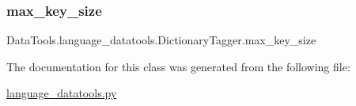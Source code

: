 \subsubsection{\texorpdfstring{max\+\_\+key\+\_\+size}{max\_key\_size}}
{\footnotesize\ttfamily Data\+Tools.\+language\+\_\+datatools.\+Dictionary\+Tagger.\+max\+\_\+key\+\_\+size}



The documentation for this class was generated from the following file\+:\begin{DoxyCompactItemize}
\item 
\mbox{\hyperlink{language__datatools_8py}{language\+\_\+datatools.\+py}}\end{DoxyCompactItemize}
